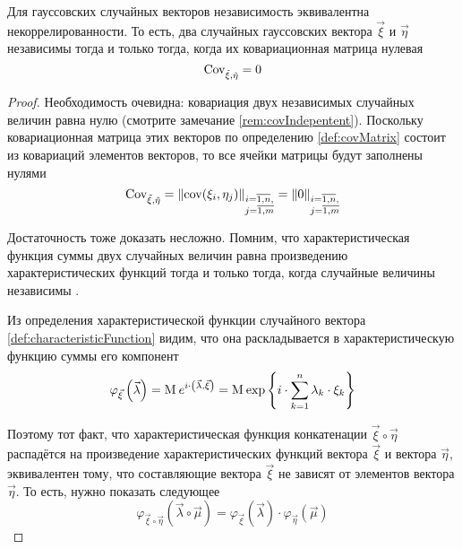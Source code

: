 \begin{theorem}
  \label{theorem:gaussianVector:independence}
  Для гауссовских случайных векторов независимость эквивалентна
  некоррелированности.
  То есть, два случайных гауссовских вектора $\vec{\xi}$ и $\vec{\eta}$
  независимы тогда и только тогда, когда их ковариационная матрица нулевая
  $$\operatorname{Cov^{}_{\vec{\xi}, \vec{\eta}}} = 0$$
\end{theorem}
\begin{proof}
  Необходимость очевидна: ковариация двух независимых случайных величин равна
  нулю (смотрите замечание \ref{rem:covIndepentent}). Поскольку
  ковариационная матрица этих векторов по определению \ref{def:covMatrix}
  состоит из ковариаций элементов векторов, то все ячейки матрицы будут
  заполнены нулями
  $$\operatorname{Cov^{}_{\vec{\xi}, \vec{\eta}}}
      = \left\| \operatorname{cov}\!\left( \xi_i, \eta_j \right) \right\|_{
      \substack{i=\overline{1,n},\\j=\overline{1,m}}}
      = \left\| 0 \right \|_{
      \substack{i=\overline{1,n},\\j=\overline{1,m}}}$$

  Достаточность тоже доказать несложно. Помним, что характеристическая
  функция суммы двух случайных величин равна произведению характеристических
  функций тогда и только тогда, когда случайные величины независимы
  \cite[с.~354]{Shiryayev1}.

  Из определения характеристической функции случайного вектора
  \ref{def:characteristicFunction} видим, что она раскладывается в
  характеристическую функцию суммы его компонент
  $$\varphi_{\vec{\xi}}\left( \vec{\lambda} \right)
      = \operatorname{M}_{} e^{i \cdot \left( \vec{\lambda}, \vec{\xi} \right)}
      = \operatorname{M}_{} 
      \exp{\left\{ i \cdot \sum_{k=1}^n \lambda_k \cdot \xi_k \right\}}$$

  Поэтому тот факт, что характеристическая функция конкатенации
  $\vec{\xi} \circ \vec{\eta}$ распадётся на произведение характеристических
  функций вектора $\vec{\xi}$ и вектора $\vec{\eta}$, эквивалентен тому, что
  составляющие вектора $\vec{\xi}$ не зависят от элементов вектора
  $\vec{\eta}$. То есть, нужно показать следующее
  $$\varphi_{\vec{\xi} \circ \vec{\eta}}\left(
      \vec{\lambda} \circ \vec{\mu} \right)
      = \varphi_{\vec{\xi}}\left( \vec{\lambda} \right)
      \cdot \varphi_{\vec{\eta}}\left( \vec{\mu} \right)$$


\end{proof}
